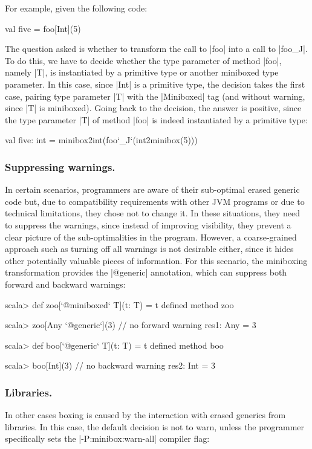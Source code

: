 For example, given the following code:

\begin{lstlisting-nobreak}
 val five = foo[Int](5)
\end{lstlisting-nobreak}

The question asked is whether to transform the call to |foo| into a call to |foo_J|. To do this, we have to decide whether the type parameter of method |foo|, namely |T|, is instantiated by a primitive type or another miniboxed type parameter. In this case, since |Int| is a primitive type, the decision takes the first case, pairing type parameter |T| with the |Miniboxed| tag (and without warning, since |T| is miniboxed). Going back to the decision, the answer is positive, since the type parameter |T| of method |foo| is indeed instantiated by a primitive type:

\begin{lstlisting-nobreak}
 val five: int = minibox2int(foo`_J`(int2minibox(5)))
\end{lstlisting-nobreak}

\subsubsection{Suppressing warnings.} In certain scenarios, programmers are aware of their sub-optimal erased generic code but, due to compatibility requirements with other JVM programs or due to technical limitations, they chose not to change it. In these situations, they need to suppress the warnings, since instead of improving visibility, they prevent a clear picture of the sub-optimalities in the program. However, a coarse-grained approach such as turning off all warnings is not desirable either, since it hides other potentially valuable pieces of information. For this scenario, the miniboxing transformation provides the |@generic| annotation, which can suppress both forward and backward warnings:

\begin{lstlisting-nobreak}
 scala> def zoo[`@miniboxed` T](t: T) = t
 defined method zoo

 scala> zoo[Any `@generic`](3) // no forward warning
 res1: Any = 3

 scala> def boo[`@generic` T](t: T) = t
 defined method boo

 scala> boo[Int](3)                   // no backward warning
 res2: Int = 3
\end{lstlisting-nobreak}


\subsubsection{Libraries.} In other cases boxing is caused by the interaction with erased generics from libraries. In this case, the default decision is not to warn, unless the programmer specifically sets the |-P:minibox:warn-all| compiler flag:

